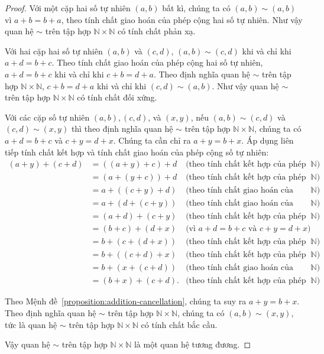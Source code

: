 \begin{proof}
    Với một cặp hai số tự nhiên $(a, b)$ bất kì, chúng ta có $(a, b)\sim (a, b)$ vì $a + b = b + a$, theo tính chất giao hoán của phép cộng hai số tự nhiên. Như vậy quan hệ $\sim$ trên tập hợp $\mathbb{N}\times\mathbb{N}$ có tính chất phản xạ.

    Với hai cặp hai số tự nhiên $(a, b)$ và $(c, d)$, $(a, b)\sim (c, d)$ khi và chỉ khi $a + d = b + c$. Theo tính chất giao hoán của phép cộng hai số tự nhiên, $a + d = b + c$ khi và chỉ khi $c + b = d + a$. Theo định nghĩa quan hệ $\sim$ trên tập hợp $\mathbb{N}\times\mathbb{N}$, $c + b = d + a$ khi và chỉ khi $(c, d)\sim (a, b)$. Như vậy quan hệ $\sim$ trên tập hợp $\mathbb{N}\times\mathbb{N}$ có tính chất đối xứng.

    Với các cặp số tự nhiên $(a, b), (c, d)$, và $(x, y)$, nếu $(a, b)\sim (c, d)$ và $(c, d)\sim (x, y)$ thì theo định nghĩa quan hệ $\sim$ trên tập hợp $\mathbb{N}\times\mathbb{N}$, chúng ta có $a + d = b + c$ và $c + y = d + x$. Chúng ta cần chỉ ra $a + y = b + x$. Áp dụng liên tiếp tính chất kết hợp và tính chất giao hoán của phép cộng số tự nhiên:
    \begin{align*}
        (a + y) + (c + d) & = ((a + y) + c) + d  & \text{(theo tính chất kết hợp của phép cộng trên $\mathbb{N}$)}   \\
                          & = (a + (y + c)) + d  & \text{(theo tính chất kết hợp của phép cộng trên $\mathbb{N}$)}   \\
                          & = a + ((c + y) + d)  & \text{(theo tính chất giao hoán của phép cộng trên $\mathbb{N}$)} \\
                          & = a + (d + (c + y))  & \text{(theo tính chất giao hoán của phép cộng trên $\mathbb{N}$)} \\
                          & = (a + d) + (c + y)  & \text{(theo tính chất kết hợp của phép cộng trên $\mathbb{N}$)}   \\
                          & = (b + c) + (d + x)  & \text{(vì $a + d = b + c$ và $c  + y = d + x$)}                   \\
                          & = b + (c + (d + x))  & \text{(theo tính chất kết hợp của phép cộng trên $\mathbb{N}$)}   \\
                          & = b + ((c + d) + x)  & \text{(theo tính chất kết hợp của phép cộng trên $\mathbb{N}$)}   \\
                          & = b + (x + (c + d))  & \text{(theo tính chất giao hoán của phép cộng trên $\mathbb{N}$)} \\
                          & = (b + x) + (c + d). & \text{(theo tính chất kết hợp của phép cộng trên $\mathbb{N}$)}
    \end{align*}

    Theo Mệnh đề~\ref{proposition:addition-cancellation}, chúng ta suy ra $a + y = b + x$. Theo định nghĩa quan hệ $\sim$ trên tập hợp $\mathbb{N}\times\mathbb{N}$, chúng ta có $(a, b)\sim (x, y)$, tức là quan hệ $\sim$ trên tập hợp $\mathbb{N}\times\mathbb{N}$ có tính chất bắc cầu.

    Vậy quan hệ $\sim$ trên tập hợp $\mathbb{N}\times\mathbb{N}$ là một quan hệ tương đương.
\end{proof}

